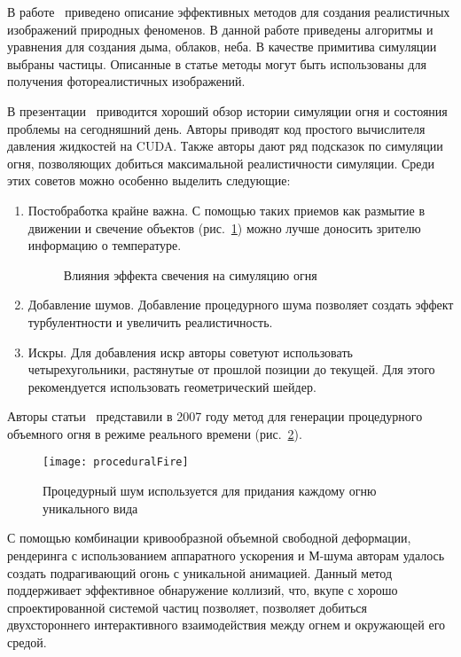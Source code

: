 В работе~\cite{NaturalPhenomena} приведено описание эффективных методов для
создания реалистичных изображений природных феноменов. В данной работе приведены
алгоритмы и уравнения для создания дыма, облаков, неба. В качестве примитива
симуляции выбраны частицы. Описанные в статье методы могут быть использованы для
получения фотореалистичных изображений.

В презентации~\cite{RealTimeNVIDIA} приводится хороший обзор истории симуляции
огня и состояния проблемы на сегодняшний день. Авторы приводят код простого
вычислителя давления жидкостей на CUDA\@. Также авторы дают ряд подсказок по
симуляции огня, позволяющих добиться максимальной реалистичности симуляции.
Среди этих советов можно особенно выделить следующие:
\begin{enumerate}
    \item Постобработка крайне важна. С помощью таких приемов как размытие в
        движении и свечение объектов (рис.~\ref{fig:GlowEffect}) можно лучше
        доносить зрителю информацию о температуре.
    \begin{figure}[htb]
        \centering
        \qquad
        \caption{Влияния эффекта свечения на симуляцию огня}%
        \label{fig:GlowEffect}%
    \end{figure}
    \item Добавление шумов. Добавление процедурного шума позволяет создать
        эффект турбулентности и увеличить реалистичность.
    \item Искры. Для добавления искр авторы советуют использовать
        четырехугольники, растянутые от прошлой позиции до текущей. Для этого
        рекомендуется использовать геометрический шейдер.
\end{enumerate}

Авторы статьи~\cite{RealTimeVolumetric} представили в 2007 году метод для
генерации процедурного объемного огня в режиме реального времени
(рис.~\ref{fig:proceduralFire}).
\begin{figure}[htb]
	\centering
    \texttt{[image: proceduralFire]}
    \caption{Процедурный шум используется для придания каждому огню уникального
    вида}%
    \label{fig:proceduralFire}
\end{figure}
С помощью комбинации кривообразной объемной свободной деформации, рендеринга с
использованием аппаратного ускорения и М-шума авторам удалось создать
подрагивающий огонь с уникальной анимацией. Данный метод поддерживает
эффективное обнаружение коллизий, что, вкупе с хорошо спроектированной системой
частиц позволяет, позволяет добиться двухстороннего интерактивного
взаимодействия между огнем и окружающей его средой.

